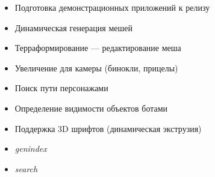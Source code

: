 \documentclass[a4paper,12pt,oneside]{sphinxmanual}
\begin{document}
\begin{itemize}
\item {} 
Подготовка демонстрационных приложений к релизу

\item {} 
Динамическая генерация мешей

\item {} 
Терраформирование — редактирование меша

\item {} 
Увеличение для камеры (бинокли, прицелы)

\item {} 
Поиск пути персонажами

\item {} 
Определение видимости объектов ботами

\item {} 
Поддержка 3D шрифтов (динамическая экструзия)

\end{itemize}
\begin{itemize}
\item {} 
\emph{genindex}

\item {} 
\emph{search}

\end{itemize}



\renewcommand{\indexname}{Index}
\printindex
\end{document}
